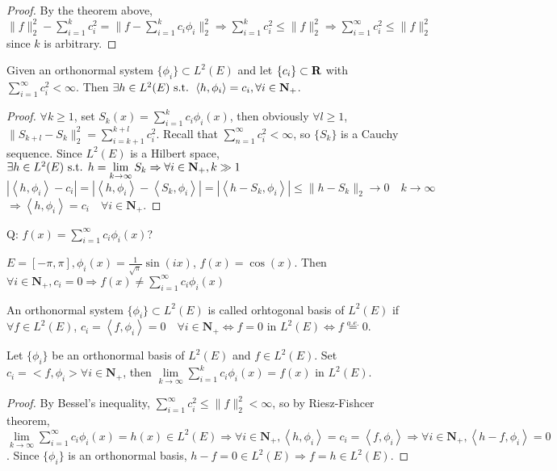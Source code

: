 \documentclass{article}
\begin{document}
\begin{proof}
By the theorem above, $\|f\|_2^2-\sum\limits_{i=1}^k c_i^2=\|f-\sum\limits_{i=1}^k c_i\phi_i\|_2^2\Rightarrow \sum\limits_{i=1}^k c_i^2\leq \|f\|_2^2\Rightarrow \sum\limits_{i=1}^\infty c_i^2\leq \|f\|_2^2$ since $k$ is arbitrary.
\end{proof}

\begin{Thm}
Given an orthonormal system $\{\phi_i\}\subset L^2(E)$ and let $\{c_i\}\subset \mathbf{R}$ with $\sum\limits_{i=1}^\infty c_i^2<\infty$. Then $\exists h\in L^2(E)\text{ s.t. } \left<h,\phi_i\right>=c_i,\forall i\in\mathbf{N}_+$.
\end{Thm}
\begin{proof}
$\forall k\geq 1$, set $S_k(x)=\sum\limits_{i=1}^kc_i\phi_i(x)$, then obviously $\forall l\geq 1$, $\|S_{k+l}-S_{k}\|_2^2=\sum\limits_{i=k+1}^{k+l}c_i^2$. Recall that $\sum\limits_{n=1}^\infty c_i^2<\infty$, so $\{S_k\}$ is a Cauchy sequence. Since $L^2(E)$ is a Hilbert space, $\exists h\in L^2(E)\text{ s.t. } h=\lim\limits_{k\to\infty}S_k\Rightarrow \forall i\in\mathbf{N}_+, k\gg 1$
\[|\left<h,\phi_i\right>-c_i|=|\left<h,\phi_i\right>-\left<S_k,\phi_i\right>|=|\left<h-S_k,\phi_i\right>|\leq \|h-S_k\|_2\to 0\quad k\to\infty\] 
$\Rightarrow \left<h,\phi_i\right>=c_i\quad\forall i\in \mathbf{N}_+$. 
\end{proof}

Q: $f(x)=\sum\limits_{i=1}^\infty c_i\phi_i(x)$?

\begin{Eg}
$E=[-\pi,\pi], \phi_i(x)=\frac{1}{\sqrt{\pi}}\sin(ix)$, $f(x)=\cos(x)$. Then $\forall i\in \mathbf{N}_+, c_i=0\Rightarrow f(x)\neq\sum\limits_{i=1}^\infty c_i\phi_i(x)$
\end{Eg}

\begin{Def}
An orthonormal system $\{\phi_i\}\subset L^2(E)$ is called orhtogonal basis of $L^2(E)$ if $\forall f\in L^2(E)$, $c_i=\left<f,\phi_i\right>=0\quad \forall i\in\mathbf{N}_+\Leftrightarrow f=0$ in $L^2(E)\Leftrightarrow f\stackrel{a.e.}{=}0$.
\end{Def}

\begin{Thm}
Let $\{\phi_i\}$ be an orthonormal basis of $L^2(E)$ and $f\in L^2(E)$. Set $c_i=<f,\phi_i>\forall i\in\mathbf{N}_+$, then $\lim\limits_{k\to\infty}\sum\limits_{i=1}^k c_i\phi_i(x)=f(x)$ in $L^2(E)$.
\end{Thm}
\begin{proof}
By Bessel's inequality, $\sum\limits_{i=1}^\infty c_i^2\leq \|f\|_2^2<\infty$, so by Riesz-Fishcer theorem, $\lim\limits_{k\to\infty}\sum\limits_{i=1}^\infty c_i\phi_i(x)=h(x)\in L^2(E)\Rightarrow \forall i\in\mathbf{N}_+,\left<h,\phi_i\right>=c_i=\left<f,\phi_i\right>\Rightarrow \forall i\in \mathbf{N}_+,\left<h-f,\phi_i\right>=0$. Since $\{\phi_i\}$ is an orthonormal basis, $h-f=0\in L^2(E)\Rightarrow f=h\in L^2(E)$.
\end{proof}
\end{document}

